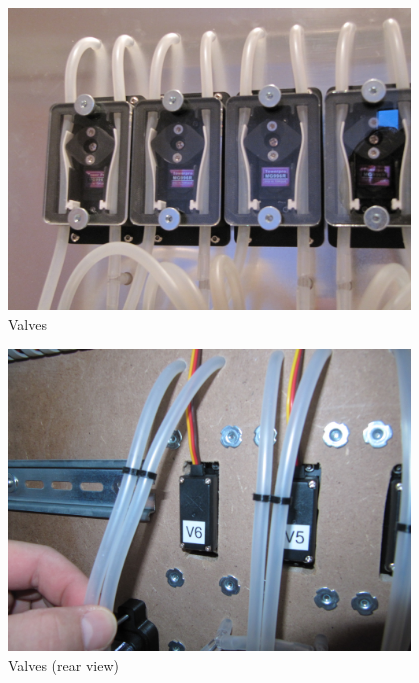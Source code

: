 \documentclass[a4paper]{scrartcl}
\begin{document}
\begin{figure}
  \centering
  \includegraphics[height=8cm]{pics/valve_front}
  \caption{Valves} \label{valve_front}
\end{figure}

\begin{figure}
  \centering
  \includegraphics[height=8cm]{pics/valve_rear}
  \caption{Valves (rear view)} \label{valve_rear}
\end{figure}
\end{document}
